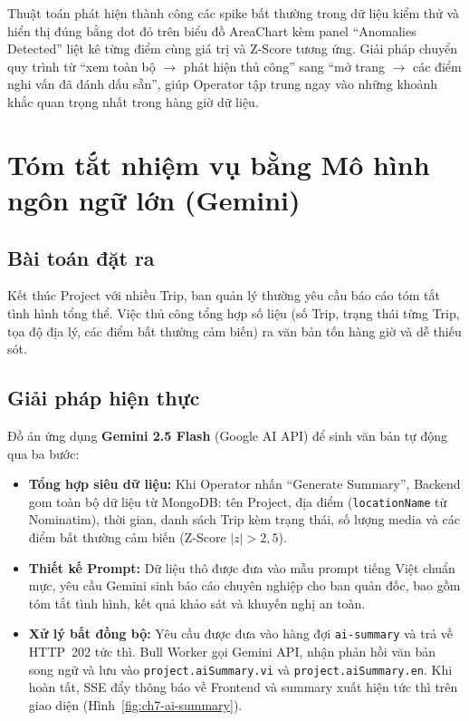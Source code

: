 \documentclass[../DoAn.tex]{subfiles}
\begin{document}
Thuật toán phát hiện thành công các spike bất thường trong dữ liệu kiểm thử và hiển thị đúng bằng dot đỏ trên biểu đồ AreaChart kèm panel ``Anomalies Detected'' liệt kê từng điểm cùng giá trị và Z-Score tương ứng. Giải pháp chuyển quy trình từ ``xem toàn bộ $\to$ phát hiện thủ công'' sang ``mở trang $\to$ các điểm nghi vấn đã đánh dấu sẵn'', giúp Operator tập trung ngay vào những khoảnh khắc quan trọng nhất trong hàng giờ dữ liệu.

\section{Tóm tắt nhiệm vụ bằng Mô hình ngôn ngữ lớn (Gemini)}
\label{section:7.9}

\subsection{Bài toán đặt ra}

Kết thúc Project với nhiều Trip, ban quản lý thường yêu cầu báo cáo tóm tắt tình hình tổng thể. Việc thủ công tổng hợp số liệu (số Trip, trạng thái từng Trip, tọa độ địa lý, các điểm bất thường cảm biến) ra văn bản tốn hàng giờ và dễ thiếu sót.

\subsection{Giải pháp hiện thực}

Đồ án ứng dụng \textbf{Gemini 2.5 Flash} (Google AI API) để sinh văn bản tự động qua ba bước:

\begin{itemize}[leftmargin=*, topsep=4pt, itemsep=4pt]
  \item \textbf{Tổng hợp siêu dữ liệu:} Khi Operator nhấn ``Generate Summary'', Backend gom toàn bộ dữ liệu từ MongoDB: tên Project, địa điểm (\texttt{locationName} từ Nominatim), thời gian, danh sách Trip kèm trạng thái, số lượng media và các điểm bất thường cảm biến (Z-Score $|z| > 2{,}5$).

  \item \textbf{Thiết kế Prompt:} Dữ liệu thô được đưa vào mẫu prompt tiếng Việt chuẩn mực, yêu cầu Gemini sinh báo cáo chuyên nghiệp cho ban quản đốc, bao gồm tóm tắt tình hình, kết quả khảo sát và khuyến nghị an toàn.

  \item \textbf{Xử lý bất đồng bộ:} Yêu cầu được đưa vào hàng đợi \texttt{ai-summary} và trả về HTTP~202 tức thì. Bull Worker gọi Gemini API, nhận phản hồi văn bản song ngữ và lưu vào \texttt{project.aiSummary.vi} và \texttt{project.aiSummary.en}. Khi hoàn tất, SSE đẩy thông báo về Frontend và summary xuất hiện tức thì trên giao diện (Hình~\ref{fig:ch7-ai-summary}).
\end{itemize}
\end{document}
